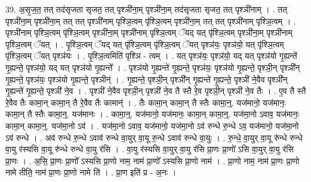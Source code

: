 \documentclass[17pt]{extarticle}
\begin{document}
39. अ॒सृ॒ज॒त॒ तत् तद॑सृजता सृजत॒ तत् पृश्ञी॑ना॒म् पृश्ञी॑ना॒म् तद॑सृजता सृजत॒ तत् पृश्ञी॑नाम् । . तत् पृश्ञी॑ना॒म् पृश्ञी॑ना॒म् तत् तत् पृश्ञी॑नाम् पृश्ञि॒त्वम् पृ॑श्ञि॒त्वम् पृश्ञी॑ना॒म् तत् तत् पृश्ञी॑नाम् पृश्ञि॒त्वम् । . पृश्ञी॑नाम् पृश्ञि॒त्वम् पृ॑श्ञि॒त्वम् पृश्ञी॑ना॒म् पृश्ञी॑नाम् पृश्ञि॒त्वम् ॅयद् यत् पृ॑श्ञि॒त्वम् पृश्ञी॑ना॒म् पृश्ञी॑नाम् पृश्ञि॒त्वम् ॅयत् । . पृ॒श्ञि॒त्वम् ॅयद् यत् पृ॑श्ञि॒त्वम् पृ॑श्ञि॒त्वम् ॅयत् पृश्ञ॑यः॒ पृश्ञ॑यो॒ यत् पृ॑श्ञि॒त्वम् पृ॑श्ञि॒त्वम् ॅयत् पृश्ञ॑यः । . पृ॒श्ञि॒त्वमिति॑ पृश्ञि - त्वम् । . यत् पृश्ञ॑यः॒ पृश्ञ॑यो॒ यद् यत् पृश्ञ॑यो गृ॒ह्यन्ते॑ गृ॒ह्यन्ते॒ पृश्ञ॑यो॒ यद् यत् पृश्ञ॑यो गृ॒ह्यन्ते᳚ । . पृश्ञ॑यो गृ॒ह्यन्ते॑ गृ॒ह्यन्ते॒ पृश्ञ॑यः॒ पृश्ञ॑यो गृ॒ह्यन्ते॒ पृश्ञी॒न् पृश्ञी᳚न् गृ॒ह्यन्ते॒ पृश्ञ॑यः॒ पृश्ञ॑यो गृ॒ह्यन्ते॒ पृश्ञीन्॑ । . गृ॒ह्यन्ते॒ पृश्ञी॒न् पृश्ञी᳚न् गृ॒ह्यन्ते॑ गृ॒ह्यन्ते॒ पृश्ञी॑ ने॒वैव पृश्ञी᳚न् गृ॒ह्यन्ते॑ गृ॒ह्यन्ते॒ पृश्ञी॑ ने॒व । . पृश्ञी॑ ने॒वैव पृश्ञी॒न् पृश्ञी॑ ने॒व तै स्तै रे॒व पृश्ञी॒न् पृश्ञी॑ ने॒व तैः । . ए॒व तै स्तै रे॒वैव तैः कामा॒न् कामा॒न् तै रे॒वैव तैः कामान्॑ । . तैः कामा॒न् कामा॒न् तै स्तैः कामा॒न्॒. यज॑मानो॒ यज॑मानः॒ कामा॒न् तै स्तैः कामा॒न्॒. यज॑मानः । . कामा॒न्॒. यज॑मानो॒ यज॑मानः॒ कामा॒न् कामा॒न्॒. यज॑मा॒नो ऽवाव॒ यज॑मानः॒ कामा॒न् कामा॒न्॒. यज॑मा॒नो ऽव॑ । . यज॑मा॒नो ऽवाव॒ यज॑मानो॒ यज॑मा॒नो ऽव॑ रुन्धे रु॒न्धे ऽव॒ यज॑मानो॒ यज॑मा॒नो ऽव॑ रुन्धे । . अव॑ रुन्धे रु॒न्धे ऽवाव॑ रुन्धे वा॒युर् वा॒यू रु॒न्धे ऽवाव॑ रुन्धे वा॒युः । . रु॒न्धे॒ वा॒युर् वा॒यू रु॑न्धे रुन्धे वा॒यु र॑स्यसि वा॒यू रु॑न्धे रुन्धे वा॒यु र॑सि । . वा॒यु र॑स्यसि वा॒युर् वा॒यु र॑सि प्रा॒णः प्रा॒णो॑ ऽसि वा॒युर् वा॒यु र॑सि प्रा॒णः । . अ॒सि॒ प्रा॒णः प्रा॒णो᳚ ऽस्यसि प्रा॒णो नाम॒ नाम॑ प्रा॒णो᳚ ऽस्यसि प्रा॒णो नाम॑ । . प्रा॒णो नाम॒ नाम॑ प्रा॒णः प्रा॒णो नामे तीति॒ नाम॑ प्रा॒णः प्रा॒णो नामे ति॑ । . प्रा॒ण इति॑ प्र - अ॒नः । \newline
\pagebreak
{}
\end{document}
